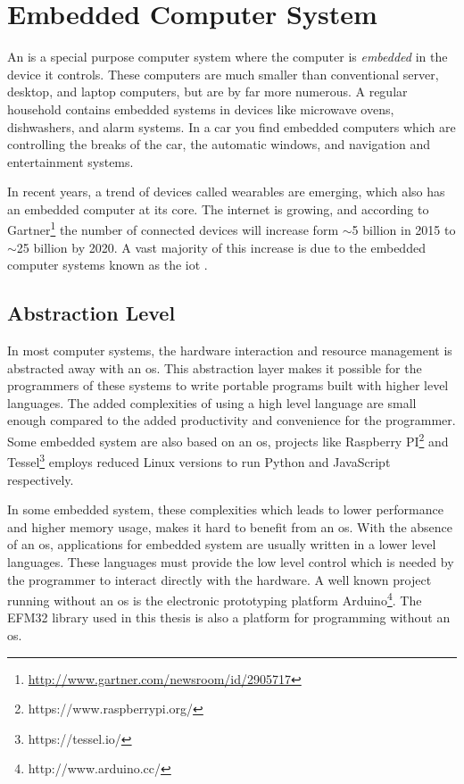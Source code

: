 \section{Embedded Computer System}
An  is a special purpose computer system where the computer is \emph{embedded} in the device it controls.
These computers are much smaller than conventional server, desktop, and laptop computers, but are by far more numerous.
A regular household contains embedded systems in devices like microwave ovens, dishwashers, and alarm systems.
In a car you find embedded computers which are controlling the breaks of the car, the automatic windows, and navigation and entertainment systems.

In recent years, a trend of devices called wearables are emerging, which also has an embedded computer at its core.
The internet is growing, and according to Gartner\footnote{\url{http://www.gartner.com/newsroom/id/2905717}} the number of connected devices will increase form $\sim$5 billion in 2015 to $\sim$25 billion by 2020.
A vast majority of this increase is due to the embedded computer systems known as the \gls{iot} \cite{Valhouli2010}.

\subsection{Abstraction Level}
In most computer systems, the hardware interaction and resource management is abstracted away with an \gls{os}.
This abstraction layer makes it possible for the programmers of these systems to write portable programs built with higher level languages.
The added complexities of using a high level language are small enough compared to the added productivity and convenience for the programmer.
Some embedded system are also based on an \gls{os}, projects like Raspberry PI\footnote{https://www.raspberrypi.org/} and Tessel\footnote{https://tessel.io/} employs reduced Linux versions to run Python and JavaScript respectively.

In some embedded system, these complexities which leads to lower performance and higher memory usage, makes it hard to benefit from an \gls{os}.
With the absence of an \gls{os}, applications for embedded system are usually written in a lower level languages.
These languages must provide the low level control which is needed by the programmer to interact directly with the hardware.
A well known project running without an \gls{os} is the electronic prototyping platform Arduino\footnote{http://www.arduino.cc/}.
The EFM32 {\emlib} library used in this thesis is also a platform for {\C} programming without an \gls{os}.

